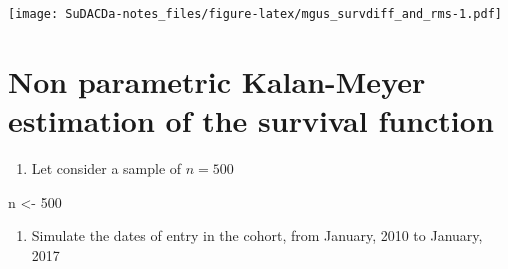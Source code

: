 \documentclass[]{book}
\newenvironment{Shaded}{\begin{snugshade}}{\end{snugshade}}
\newcommand{\KeywordTok}[1]{\textcolor[rgb]{0.13,0.29,0.53}{\textbf{{#1}}}}
\newcommand{\DataTypeTok}[1]{\textcolor[rgb]{0.13,0.29,0.53}{{#1}}}
\newcommand{\DecValTok}[1]{\textcolor[rgb]{0.00,0.00,0.81}{{#1}}}
\newcommand{\FloatTok}[1]{\textcolor[rgb]{0.00,0.00,0.81}{{#1}}}
\newcommand{\StringTok}[1]{\textcolor[rgb]{0.31,0.60,0.02}{{#1}}}
\newcommand{\CommentTok}[1]{\textcolor[rgb]{0.56,0.35,0.01}{\textit{{#1}}}}
\newcommand{\OtherTok}[1]{\textcolor[rgb]{0.56,0.35,0.01}{{#1}}}
\newcommand{\NormalTok}[1]{{#1}}
\providecommand{\tightlist}{%
  \setlength{\itemsep}{0pt}\setlength{\parskip}{0pt}}
\theoremstyle{definition}
\theoremstyle{definition}
\theoremstyle{definition}
\theoremstyle{remark}
\begin{document}
\begin{Shaded}
\end{Shaded}

\texttt{[image: SuDACDa-notes\_files/figure-latex/mgus\_survdiff\_and\_rms-1.pdf]}

\section{Non parametric Kalan-Meyer estimation of the survival
function}\label{non-parametric-kalan-meyer-estimation-of-the-survival-function}

\begin{enumerate}
\def\labelenumi{\arabic{enumi}.}
\tightlist
\item
  Let consider a sample of \(n = 500\)
\end{enumerate}

\begin{Shaded}
\begin{Highlighting}[]
\NormalTok{n <-}\StringTok{ }\DecValTok{500}
\end{Highlighting}
\end{Shaded}

\begin{enumerate}
\def\labelenumi{\arabic{enumi}.}
\setcounter{enumi}{1}
\tightlist
\item
  Simulate the dates of entry in the cohort, from January, 2010 to
  January, 2017
\end{enumerate}

\begin{Shaded}
\end{Shaded}
\end{document}
